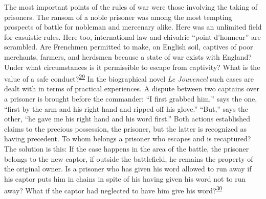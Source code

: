 The most important points of the rules of war were those involving the
taking of prisoners. The ransom of a noble prisoner was among the most
tempting prospects of battle for nobleman and mercenary alike. Here was
an unlimited field for casuistic rules. Here too, international law and
chivalric ``point d'honneur'' are
\protect\hypertarget{18_Chapter_Eleven__THE_FORMS_OF_THO.xhtmlux5cux23page_278}{}{}scrambled.
Are Frenchmen permitted to make, on English soil, captives of poor
merchants, farmers, and herdsmen because a state of war exists with
England? Under what circumstances is it permissible to escape from
captivity? What is the value of a safe
conduct?\textsuperscript{\protect\hypertarget{18_Chapter_Eleven__THE_FORMS_OF_THO.xhtmlux5cux23id_575}{\protect\hyperlink{23_NOTES.xhtmlux5cux23id_576}{29}}}
In the biographical novel \emph{Le Jouvencel} such cases are dealt with
in terms of practical experiences. A dispute between two captains over a
prisoner is brought before the commander: ``I first grabbed him,'' says
the one, ``first by the arm and his right hand and ripped off his
glove.'' ``But,'' says the other, ``he gave me his right hand and his
word first.'' Both actions established claims to the precious
possession, the prisoner, but the latter is recognized as having
precedent. To whom belongs a prisoner who escapes and is recaptured? The
solution is this: If the case happens in the area of the battle, the
prisoner belongs to the new captor, if outside the battlefield, he
remains the property of the original owner. Is a prisoner who has given
his word allowed to run away if his captor puts him in chains in spite
of his having given his word not to run away? What if the captor had
neglected to have him give his
word?\textsuperscript{\protect\hypertarget{18_Chapter_Eleven__THE_FORMS_OF_THO.xhtmlux5cux23id_573}{\protect\hyperlink{23_NOTES.xhtmlux5cux23id_574}{30}}}

